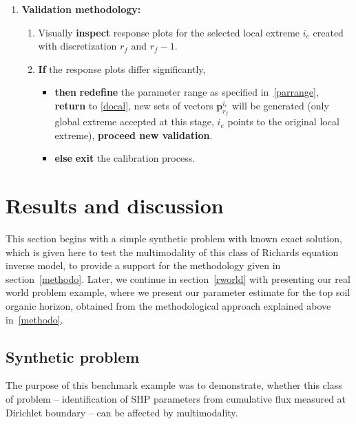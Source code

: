 \documentclass[review,times,3p,twocolumn,10pt]{elsarticle}
\renewcommand{\vec}{\mathbf}
\begin{document}
\begin{enumerate}[label={\bf \Roman* .}]
\begin{enumerate}
       \item {\bf Validation methodology:}
       
       \begin{enumerate}
       \item Visually {\bf inspect} response  plots for the selected local extreme $i_e$ created with discretization $r_f$ and $r_f-1$.
       \item \label{cond} {\bf If} the response plots differ significantly,
       \begin{itemize}
          \item {\bf then} {\bf redefine} the parameter range as specified in~\eqref{parrange}, {\bf return} to \ref{docal},  new sets of vectors  $\vec{p}_{r_f}^{i_e}$ will be generated (only global extreme accepted at this stage,  $i_e$ points to the original local extreme), {\bf proceed new validation}.  
          \item {\bf else} {\bf exit} the calibration process.
      \end{itemize}
\end{enumerate}

\end{enumerate}
\end{enumerate}






 



\section{Results and discussion} 

This section begins with  a simple synthetic problem with known exact solution, which is given here to test the multimodality of this class of Richards equation inverse model, to provide a support for the methodology given in section~\ref{methodo}. Later,  we continue in section~\ref{rworld} with presenting our real world problem example, where we  present our parameter estimate for the top soil organic horizon, obtained from the methodological approach explained above in~\ref{methodo}.

\subsection{Synthetic problem}
 \label{benchmarks}
 
The purpose of this benchmark example was to demonstrate, whether this class of problem -- identification of SHP parameters from cumulative flux measured at Dirichlet boundary -- can be affected by multimodality.
\end{document}
